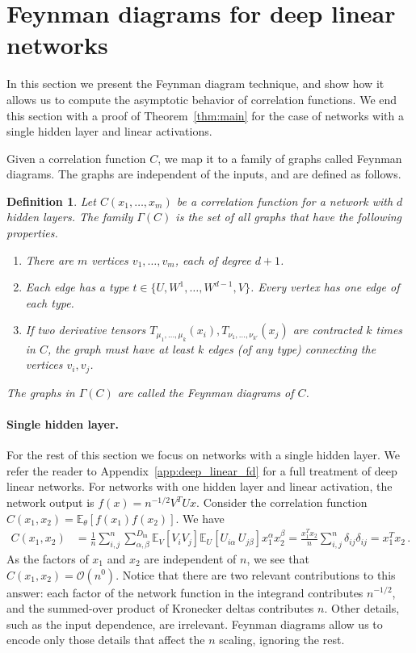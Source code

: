 \documentclass[english]{article}
\newtheorem{definition}{Definition}
\newcommand{\cO}{\ensuremath{\mathcal{O}}}
\newcommand{\Din}{\ensuremath{D_{\mathrm{in}}}}
\newcommand{\lexpp}[1]{\mathbb{E}_{#1}\left[}
\newcommand{\rexp}{\right]}
\begin{document}
\section{Feynman diagrams for deep linear networks}
\label{sec:feynman}
In this section we present the Feynman diagram technique, and show how it allows us to compute the asymptotic behavior of correlation functions.
We end this section with a proof of Theorem~\ref{thm:main} for the case of networks with a single hidden layer and linear activations.

Given a correlation function $C$, we map it to a family of graphs called Feynman diagrams.
The graphs are independent of the inputs, and are defined as follows.
\begin{definition}\label{def:feynman}
  Let $C(x_1,\dots,x_m)$ be a correlation function for a network with $d$ hidden layers.
  The family $\Gamma(C)$ is the set of all graphs that have the following properties.
  \begin{enumerate}
  \item There are $m$ vertices $v_1,\dots,v_m$, each of degree $d+1$.
  \item Each edge has a type $t \in \{ U,W^1,\dots,W^{d-1},V \}$. Every vertex has one edge of each type.
  \item If two derivative tensors $T_{\mu_1,\dots,\mu_k}(x_i),T_{\nu_1,\dots,\nu_{k'}}(x_j)$ are contracted $k$ times in $C$, the graph must have at least $k$ edges (of any type) connecting the vertices $v_i,v_j$.
  \end{enumerate}
  The graphs in $\Gamma(C)$ are called the \emph{Feynman diagrams} of $C$.
\end{definition}

\paragraph{Single hidden layer.} 
For the rest of this section we focus on networks with a single hidden layer.
We refer the reader to Appendix~\ref{app:deep_linear_fd} for a full treatment of deep linear networks.
For networks with one hidden layer and linear activation, the network output is $f(x) = n^{-1/2} V^T U x$.
Consider the correlation function $C(x_1,x_2) = \lexpp{\theta} f(x_1)f(x_2) \rexp$.
We have
\begin{align}
  C(x_1,x_2) &= 
  \frac{1}{n} \sum_{i,j}^n \sum_{\alpha,\beta}^{\Din}
  \lexpp{V} V_i V_j \rexp \lexpp{U} U_{i\alpha} \, U_{j\beta} \rexp
  x_1^\alpha x_2^\beta
  = \frac{x_1^T x_2}{n} \sum_{i,j}^n \delta_{ij} \delta_{ij} 
  = x_1^T x_2 \,. \label{eq:fsqr_main}
\end{align}
As the factors of $x_1$ and $x_2$ are independent of $n$, we see that $C(x_1,x_2) = \cO(n^0)$. 
Notice that there are two relevant contributions to this answer: each factor of the network function in the integrand contributes $n^{-1/2}$, and the summed-over product of Kronecker deltas contributes $n$.
Other details, such as the input dependence, are irrelevant.
Feynman diagrams allow us to encode only those details that affect the $n$ scaling, ignoring the rest.
\end{document}
